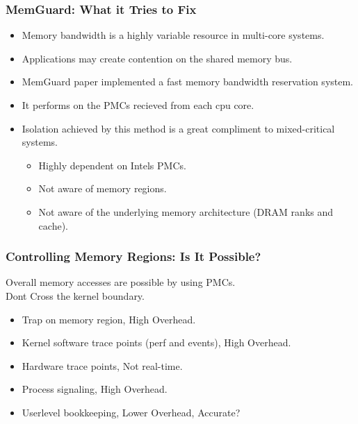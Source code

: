 \documentclass{beamer}
\begin{document}
\begin{frame}
    \frametitle{MemGuard: What it Tries to Fix}
    \begin{itemize}
        \item Memory bandwidth is a highly variable resource in multi-core
            systems.
        \item Applications may create contention on the shared memory bus.
        \item MemGuard paper implemented a fast memory bandwidth reservation
            system. \cite{yun2013memguard}
        \item It performs on the PMCs recieved from each cpu core.
        \item Isolation achieved by this method is a great compliment to
            mixed-critical systems.
            \begin{itemize}
                \item Highly dependent on Intels PMCs.
                \item Not aware of memory regions.
                \item Not aware of the underlying memory architecture
                    (DRAM ranks and cache).
            \end{itemize}
    \end{itemize}
\end{frame}

\begin{frame}
    \frametitle{Controlling Memory Regions: Is It Possible?}
    Overall memory accesses are possible by using PMCs. \\
    Dont Cross the kernel boundary.
    \begin{itemize}
        \item Trap on memory region, High Overhead.
        \item Kernel software trace points (perf and events), High Overhead.
        \item Hardware trace points, Not real-time.
        \item Process signaling, High Overhead.
        \item Userlevel bookkeeping, Lower Overhead, Accurate?
    \end{itemize}
\end{frame}
\end{document}
